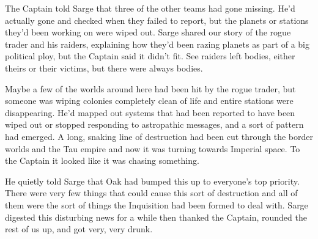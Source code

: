 The Captain told Sarge that three of the other teams had gone missing. 
He'd actually gone and checked when they failed to report, but the planets or stations they'd been working on were wiped out. 
Sarge shared our story of the rogue trader and his raiders, explaining how they'd been razing planets as part of a big political ploy, but the Captain said it didn't fit. 
See raiders left bodies, either theirs or their victims, but there were always bodies.

Maybe a few of the worlds around here had been hit by the rogue trader, but someone was wiping colonies completely clean of life and entire stations were disappearing. 
He'd mapped out systems that had been reported to have been wiped out or stopped responding to astropathic messages, and a sort of pattern had emerged. 
A long, snaking line of destruction had been cut through the border worlds and the Tau empire and now it was turning towards Imperial space. 
To the Captain it looked like it was chasing something.

He quietly told Sarge that Oak had bumped this up to everyone's top priority. 
There were very few things that could cause this sort of destruction and all of them were the sort of things the Inquisition had been formed to deal with. 
Sarge digested this disturbing news for a while then thanked the Captain, rounded the rest of us up, and got very, very drunk.

